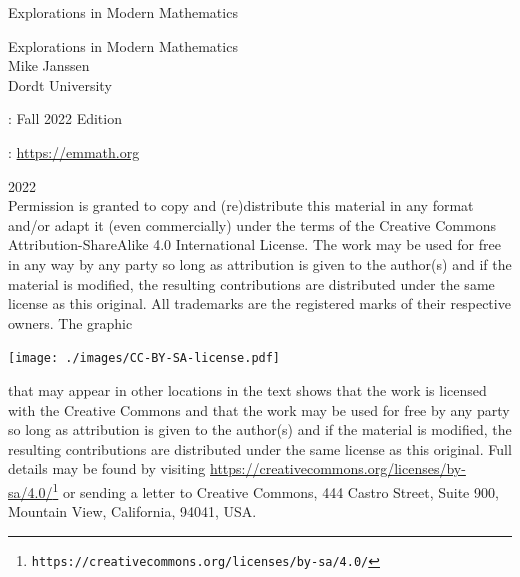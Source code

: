 \documentclass[oneside,10pt,]{book}
\newcommand{\titlepagefont}{\relax}
\numberwithin{equation}{section}
\begin{document}
\raggedbottom
\frontmatter
\thispagestyle{empty}
{\titlepagefont\centering
\vspace*{0.28\textheight}
{\Huge Explorations in Modern Mathematics}\\}
\clearpage
\thispagestyle{empty}
{\titlepagefont\centering
\vspace*{0.14\textheight}
{\Huge Explorations in Modern Mathematics}\\[3\baselineskip]
{\Large Mike Janssen}\\[0.5\baselineskip]
{\Large Dordt University}\\}
\clearpage
\thispagestyle{empty}
\hypertarget{g:colophon:idp105544742298896}{}
: Fall 2022 Edition\par\medskip
{}: \href{https:\slash{}\slash{}emmath.org}{https:\slash{}\slash{}emmath.org}\par\medskip
\noindent\textcopyright{}2022\textendash{}\quad{}\\[0.5\baselineskip]
Permission is granted to copy and (re)distribute this material in any format and\slash{}or adapt it (even commercially) under the terms of the Creative Commons Attribution-ShareAlike 4.0 International License.  The work may be used for free in any way by any party so long as attribution is given to the author(s) and if the material is modified, the resulting contributions are distributed under the same license as this original.  All trademarks\texttrademark{} are the registered\textregistered{} marks of their respective owners. The graphic \begin{sidebyside}{1}{0.375}{0.375}{0}%
\begin{sbspanel}{0.25}%
\texttt{[image: ./images/CC-BY-SA-license.pdf]}
\end{sbspanel}%
\end{sidebyside}%
 that may appear in other locations in the text shows that the work is licensed with the Creative Commons and that the work may be used for free by any party so long as attribution is given to the author(s) and if the material is modified, the resulting contributions are distributed under the same license as this original. Full details may be found by visiting \href{https://creativecommons.org/licenses/by-sa/4.0/}{https:\slash{}\slash{}creativecommons.org\slash{}licenses\slash{}by-sa\slash{}4.0\slash{}}\footnote{\nolinkurl{https://creativecommons.org/licenses/by-sa/4.0/}\label{g:fn:idp105544742303376}}  or sending a letter to Creative Commons, 444 Castro Street, Suite 900, Mountain View, California, 94041, USA.\par\medskip
\end{document}
